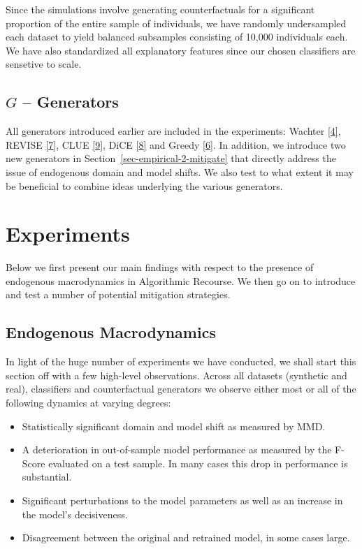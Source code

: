 \documentclass[
  conference]{IEEEtran}
\providecommand{\tightlist}{%
  \setlength{\itemsep}{0pt}\setlength{\parskip}{0pt}}\usepackage{longtable,booktabs,array}
\begin{document}
Since the simulations involve generating counterfactuals for a
significant proportion of the entire sample of individuals, we have
randomly undersampled each dataset to yield balanced subsamples
consisting of 10,000 individuals each. We have also standardized all
explanatory features since our chosen classifiers are sensetive to
scale.

\hypertarget{g-generators}{%
\subsection{\texorpdfstring{\(G\) --
Generators}{G -- Generators}}\label{g-generators}}

All generators introduced earlier are included in the experiments:
Wachter \protect\hyperlink{ref-wachter2017counterfactual}{{[}4{]}},
REVISE \protect\hyperlink{ref-joshi2019towards}{{[}7{]}}, CLUE
\protect\hyperlink{ref-antoran2020getting}{{[}9{]}}, DiCE
\protect\hyperlink{ref-mothilal2020explaining}{{[}8{]}} and Greedy
\protect\hyperlink{ref-schut2021generating}{{[}6{]}}. In addition, we
introduce two new generators in Section~\ref{sec-empirical-2-mitigate}
that directly address the issue of endogenous domain and model shifts.
We also test to what extent it may be beneficial to combine ideas
underlying the various generators.

\hypertarget{sec-empirical-2}{%
\section{Experiments}\label{sec-empirical-2}}

Below we first present our main findings with respect to the presence of
endogenous macrodynamics in Algorithmic Recourse. We then go on to
introduce and test a number of potential mitigation strategies.

\hypertarget{endogenous-macrodynamics}{%
\subsection{Endogenous Macrodynamics}\label{endogenous-macrodynamics}}

In light of the huge number of experiments we have conducted, we shall
start this section off with a few high-level observations. Across all
datasets (synthetic and real), classifiers and counterfactual generators
we observe either most or all of the following dynamics at varying
degrees:

\begin{itemize}
\tightlist
\item
  Statistically significant domain and model shift as measured by MMD.
\item
  A deterioration in out-of-sample model performance as measured by the
  F-Score evaluated on a test sample. In many cases this drop in
  performance is substantial.
\item
  Significant perturbations to the model parameters as well as an
  increase in the model's decisiveness.
\item
  Disagreement between the original and retrained model, in some cases
  large.
\end{itemize}
\end{document}
